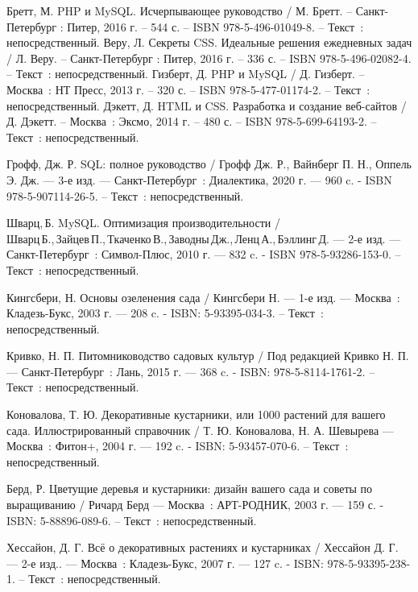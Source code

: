 
\begin{thebibliography}{9}

     Бретт, М. PHP и MySQL. Исчерпывающее руководство / М. Бретт. – Санкт-Петербург : Питер, 2016 г. – 544 с. – ISBN 978-5-496-01049-8. – Текст~: непосредственный.
     Веру, Л. Секреты CSS. Идеальные решения ежедневных задач / Л. Веру. – Санкт-Петербург : Питер, 2016 г. – 336 с. – ISBN 978-5-496-02082-4. – Текст~: непосредственный.
    	Гизберт, Д. PHP и MySQL / Д. Гизберт. – Москва~: НТ Пресс, 2013 г. – 320 с. – ISBN 978-5-477-01174-2. – Текст~: непосредственный.
		Дэкетт, Д. HTML и CSS. Разработка и создание веб-сайтов / Д. Дэкетт. – Москва~: Эксмо, 2014 г. – 480 с. – ISBN 978-5-699-64193-2. – Текст~: непосредственный.
	
	
	 Грофф, Дж. Р. SQL: полное руководство / Грофф Дж. Р., Вайнберг П. Н., Оппель Э. Дж. — 3-е изд. — Санкт-Петербург~: Диалектика, 2020 г. — 960 c. - ISBN 978-5-907114-26-5. – Текст~: непосредственный.
	
	 Шварц, Б. MySQL. Оптимизация производительности  / Шварц Б., Зайцев П., Ткаченко В., Заводны Дж., Ленц А., Бэллинг Д. — 2-е изд. — Санкт-Петербург~: Символ-Плюс, 2010 г. — 832 c. - ISBN 978-5-93286-153-0. – Текст~: непосредственный.
	
	 Кингсбери, Н. Основы озеленения сада  / Кингсбери Н. — 1-е изд. — Москва~: Кладезь-Букс, 2003 г. — 208 c. - ISBN: 5-93395-034-3. – Текст~: непосредственный.
	
	 Кривко, Н. П. Питомниководство садовых культур  / Под редакцией Кривко Н. П. — Санкт-Петербург~: Лань, 2015 г. — 368 c. - ISBN: 978-5-8114-1761-2. – Текст~: непосредственный.
	
	 Коновалова, Т. Ю. Декоративные кустарники, или 1000 растений для вашего сада. Иллюстрированный справочник / Т. Ю. Коновалова, Н. А. Шевырева — Москва~: Фитон+, 2004 г. — 192 c. - ISBN: 5-93457-070-6. – Текст~: непосредственный.
	
	 Берд, Р. Цветущие деревья и кустарники: дизайн вашего сада и советы по выращиванию  / Ричард Берд — Москва~: АРТ-РОДНИК, 2003 г. — 159 с. - ISBN: 5-88896-089-6.  – Текст~: непосредственный.
	
	\bibitem{[hesayon]} Хессайон, Д. Г. Всё о декоративных растениях и кустарниках  / Хессайон Д. Г.   — 2-е изд.. — Москва~: Кладезь-Букс, 2007 г. — 127 c. - ISBN: 978-5-93395-238-1. – Текст~: непосредственный.
	

\end{thebibliography}
